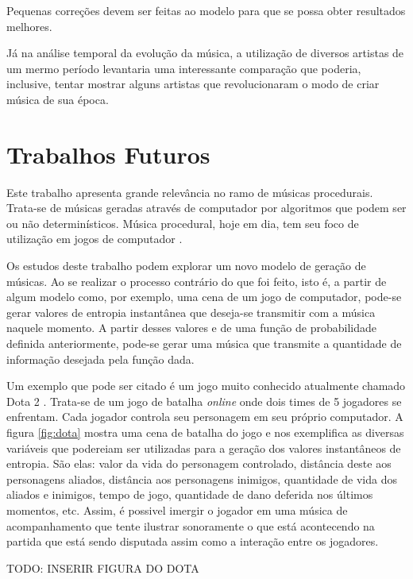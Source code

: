 Pequenas correções devem ser feitas ao modelo para que se possa obter resultados melhores.

Já na análise temporal da evolução da música, a utilização de diversos artistas de um mermo período levantaria uma interessante comparação que poderia, inclusive, tentar mostrar alguns artistas que revolucionaram o modo de criar música de sua época.

\section{Trabalhos Futuros}

Este trabalho apresenta grande relevância no ramo de músicas procedurais. Trata-se de músicas geradas através de computador por algoritmos que podem ser ou não determinísticos. Música procedural, hoje em dia, tem seu foco de utilização em jogos de computador \cite{procedural}.

Os estudos deste trabalho podem explorar um novo modelo de geração de músicas. Ao se realizar o processo contrário do que foi feito, isto é, a partir de algum modelo como, por exemplo, uma cena de um jogo de computador, pode-se gerar valores de entropia instantânea que deseja-se transmitir com a música naquele momento. A partir desses valores e de uma função de probabilidade definida anteriormente, pode-se gerar uma música que transmite a quantidade de informação desejada pela função dada.

Um exemplo que pode ser citado é um jogo muito conhecido atualmente chamado Dota 2 \cite{dota}. Trata-se de um jogo de batalha \textit{online} onde dois times de 5 jogadores se enfrentam. Cada jogador controla seu personagem em seu próprio computador. A figura \ref{fig:dota} mostra uma cena de batalha do jogo e nos exemplifica as diversas variáveis que podereiam ser utilizadas para a geração dos valores instantâneos de entropia. São elas: valor da vida do personagem controlado, distância deste aos personagens aliados, distância aos personagens inimigos, quantidade de vida dos aliados e inimigos, tempo de jogo, quantidade de dano deferida nos últimos momentos, etc. Assim, é possivel imergir o jogador em uma música de acompanhamento que tente ilustrar sonoramente o que está acontecendo na partida que está sendo disputada assim como a interação entre os jogadores.

TODO: INSERIR FIGURA DO DOTA